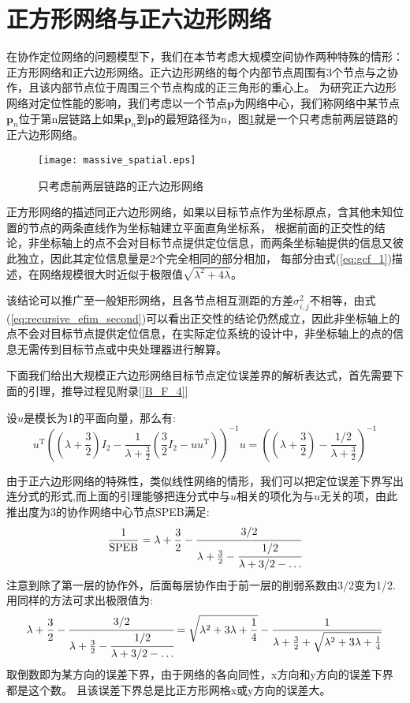 \section{正方形网络与正六边形网络}\label{section:square_and_hexagon_network}
在协作定位网络的问题模型下，我们在本节考虑大规模空间协作两种特殊的情形：
正方形网络和正六边形网络。正六边形网络的每个内部节点周围有3个节点与之协作，且该内部节点位于周围三个节点构成的正三角形的重心上。
为研究正六边形网络对定位性能的影响，我们考虑以一个节点$\bm{p}$为网络中心，我们称网络中某节点$\bm{p}_n$位于第n层链路上如果$\bm{p}_n$到$\bm{p}$的最短路径为n，图\ref{HexagonNetwork}就是一个只考虑前两层链路的正六边形网络。
\begin{figure}[h]
  \centering
  \texttt{[image: massive\_spatial.eps]}
  \caption{只考虑前两层链路的正六边形网络}\label{HexagonNetwork}
\end{figure}

正方形网络的描述同正六边形网络，如果以目标节点作为坐标原点，含其他未知位置的节点的两条直线作为坐标轴建立平面直角坐标系，
根据前面的正交性的结论，非坐标轴上的点不会对目标节点提供定位信息，而两条坐标轴提供的信息又彼此独立，因此其定位信息量是2个完全相同的部分相加，
每部分由式(\ref{eq:gcf_1})描述，在网络规模很大时近似于极限值$\sqrt{\lambda^2+4\lambda}$。

该结论可以推广至一般矩形网络，且各节点相互测距的方差$\sigma^2_{i,j}$不相等，由式(\ref{eq:recursive_efim_second})可以看出正交性的结论仍然成立，因此非坐标轴上的点不会对目标节点提供定位信息，在实际定位系统的设计中，非坐标轴上的点的信息无需传到目标节点或中央处理器进行解算。

下面我们给出大规模正六边形网络目标节点定位误差界的解析表达式，首先需要下面的引理，推导过程见附录[\ref{B_F_4}]
\begin{lemma}\label{lemma:hexagon}
  设$u$是模长为1的平面向量，那么有:
\begin{equation}\label{eq:equiv}
  u^{\textrm{T}} ((\lambda+\frac{3}{2})I_2-\frac{1}{\lambda+\frac{3}{2}}(\frac{3}{2}I_2-uu^{\textrm{T}} ))^{-1}u
  =((\lambda+\frac{3}{2})-\frac{1/2}{\lambda+\frac{3}{2}})^{-1}
\end{equation}
\end{lemma}
  由于正六边形网络的特殊性，类似线性网络的情形，我们可以把定位误差下界写出连分式的形式,而上面的引理能够把连分式中与$u$相关的项化为与$u$无关的项，由此推出度为3的协作网络中心节点SPEB满足:
  \[
\frac{1}{\text{SPEB}}=\lambda+\frac{3}{2}-\cfrac{3/2}{\lambda+\frac{3}{2}-\cfrac{1/2}{\lambda+3/2-\dots}}
  \]
  注意到除了第一层的协作外，后面每层协作由于前一层的削弱系数由3/2变为1/2.
  用同样的方法可求出极限值为:
  \[
  \lambda+\frac{3}{2}-\cfrac{3/2}{\lambda+\frac{3}{2}-\cfrac{1/2}{\lambda+3/2-\dots}}=\sqrt{\lambda^2+3\lambda+\frac{1}{4}}-\frac{1}{\lambda+\frac{3}{2}+\sqrt{\lambda^2+3\lambda+\frac{1}{4}}}
  \]
  取倒数即为某方向的误差下界，由于网络的各向同性，x方向和y方向的误差下界都是这个数。
且该误差下界总是比正方形网格x或y方向的误差大。

